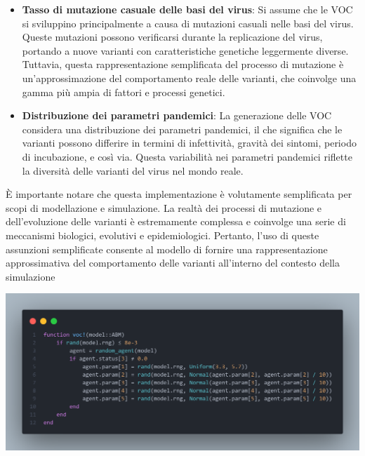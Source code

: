 \begin{itemize}
	\item \textbf{Tasso di mutazione casuale delle basi del virus}: 
	Si assume che le VOC si sviluppino principalmente a causa di 
	mutazioni casuali nelle basi del virus. Queste mutazioni possono 
	verificarsi durante la replicazione del virus, portando a nuove 
	varianti con caratteristiche genetiche leggermente diverse. 
	Tuttavia, questa rappresentazione semplificata del processo di 
	mutazione è un'approssimazione del comportamento reale delle 
	varianti, che coinvolge una gamma più ampia di fattori e processi 
	genetici.
	\item \textbf{Distribuzione dei parametri pandemici}: La generazione 
	delle VOC considera una distribuzione dei parametri pandemici, 
	il che significa che le varianti possono differire in termini di 
	infettività, gravità dei sintomi, periodo di incubazione, e così via. 
	Questa variabilità nei parametri pandemici riflette la diversità 
	delle varianti del virus nel mondo reale.
\end{itemize}

È importante notare che questa implementazione è volutamente 
semplificata per scopi di modellazione e simulazione. 
La realtà dei processi di mutazione e dell'evoluzione delle varianti è 
estremamente complessa e coinvolge una serie di meccanismi biologici, 
evolutivi e epidemiologici. Pertanto, l'uso di queste assunzioni 
semplificate consente al modello di fornire una rappresentazione 
approssimativa del comportamento delle varianti all'interno del 
contesto della simulazione \cite{Abavisani2022} \cite{Markov2023} 
\cite{https://doi.org/10.1002/jmv.27331} 

\begin{minipage}{\linewidth}
	\centering
	\includegraphics[width=\textwidth]{img/voc.png}
	\label{fig:voc}
\end{minipage}

